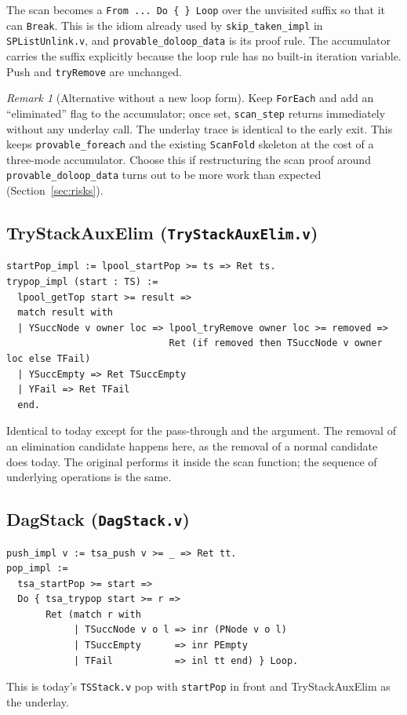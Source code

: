 \documentclass[11pt]{article}
\theoremstyle{definition}
\theoremstyle{remark}
\newtheorem{remark}[lemma]{Remark}
\newcommand{\code}[1]{\texttt{#1}}
\newcommand{\file}[1]{\texttt{#1}}
\begin{document}
The scan becomes a \code{From ... Do \{ \} Loop} over the unvisited
suffix so that it can \code{Break}. This is the idiom already used by
\code{skip\_taken\_impl} in \file{SPListUnlink.v}, and
\code{provable\_doloop\_data} is its proof rule. The accumulator carries
the suffix explicitly because the loop rule has no built-in iteration
variable. Push and \code{tryRemove} are unchanged.

\begin{remark}[Alternative without a new loop form]
Keep \code{ForEach} and add an ``eliminated'' flag to the accumulator;
once set, \code{scan\_step} returns immediately without any underlay
call. The underlay trace is identical to the early exit. This keeps
\code{provable\_foreach} and the existing \code{ScanFold} skeleton at the
cost of a three-mode accumulator. Choose this if restructuring the scan
proof around \code{provable\_doloop\_data} turns out to be more work than
expected (Section~\ref{sec:risks}).
\end{remark}

\subsection{TryStackAuxElim (\file{TryStackAuxElim.v})}

\begin{lstlisting}
startPop_impl := lpool_startPop >= ts => Ret ts.
trypop_impl (start : TS) :=
  lpool_getTop start >= result =>
  match result with
  | YSuccNode v owner loc => lpool_tryRemove owner loc >= removed =>
                             Ret (if removed then TSuccNode v owner loc else TFail)
  | YSuccEmpty => Ret TSuccEmpty
  | YFail => Ret TFail
  end.
\end{lstlisting}
Identical to today except for the pass-through and the argument. The
removal of an elimination candidate happens here, as the removal of a
normal candidate does today. The original performs it inside the scan
function; the sequence of underlying operations is the same.

\subsection{DagStack (\file{DagStack.v})}

\begin{lstlisting}
push_impl v := tsa_push v >= _ => Ret tt.
pop_impl :=
  tsa_startPop >= start =>
  Do { tsa_trypop start >= r =>
       Ret (match r with
            | TSuccNode v o l => inr (PNode v o l)
            | TSuccEmpty      => inr PEmpty
            | TFail           => inl tt end) } Loop.
\end{lstlisting}
This is today's \file{TSStack.v} pop with \code{startPop} in front and
TryStackAuxElim as the underlay.
\end{document}
